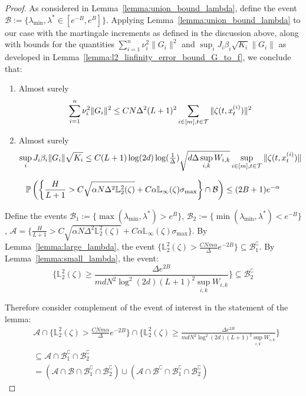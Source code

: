 \begin{proof}
    As considered in Lemma~\ref{lemma:union_bound_lambda}, define the event $\mathcal{B} := \{\lambda_{\min} , \lambda^* \in [e^{-B},e^B]\}$. Applying Lemma~\ref{lemma:union_bound_lambda} to our case with the martingale increments as defined in the discussion above, along with bounds for the quantities $\sum_{i=1}^{n}\nu_i^2\|G_i\|^2$ and $\sup_{i}J_i \beta_i \sqrt{K_i}\|G_i\|$ as developed in Lemma~\ref{lemma:l2_linfinity_error_bound_G_to_f}, we conclude that:
\begin{enumerate}
    \item Almost surely $$\sum_{i=1}^{n}\nu_i^2\|G_i\|^2 \leq C N \Delta^2(L+1)^2\sum_{i\in [m], t\in \mathcal{T}}\|\zeta(t,x^{(i)}_{t})\|^2$$ 
    \item Almost surely
    $$\sup_i J_i \beta_i \|G_i\|\sqrt{K_i} \leq C(L+1)\log(2d)\log(\tfrac{1}{\Delta})\sqrt{d\Delta\sup_{i,k}W_{i,k}}\sup_{i\in[m],t\in\mathcal{T}}\|\zeta(t,x_{t}^{(i)})\|$$ 
\end{enumerate}


    
    \begin{equation}\label{eq:conc_mart}
    \mathbb{P}\left(\biggr\{\frac{H}{L+1} > C\sqrt{\alpha N\Delta^2 \mathbb{L}_2^2(\zeta)}+C\alpha\mathbb{L}_{\infty}(\zeta)\sigma_{\max}\biggr\} \cap \mathcal{B}\right) \leq (2B+1)e^{-\alpha}
    \end{equation}

Define the events $\mathcal{B}_1 := \{\max(\lambda_{\min},\lambda^{*}) > e^B\}$, $\mathcal{B}_2 := \{\min(\lambda_{\min},\lambda^{*}) < e^{-B}\}$, $\mathcal{A} = \biggr\{\frac{H}{L+1} > C\sqrt{\alpha N\Delta^2 \mathbb{L}_2^2(\zeta)}+C\alpha\mathbb{L}_{\infty}(\zeta)\sigma_{\max}\biggr\}$. By Lemma~\ref{lemma:large_lambda}, the event  $\{\mathbb{L}_2^2(\zeta) > \frac{CNm\alpha}{\Delta}e^{-2B}\} \subseteq \mathcal{B}_1^{\complement}$. By Lemma~\ref{lemma:small_lambda}, the event: $$\biggr\{\mathbb{L}_2^2(\zeta)\geq \frac{\Delta e^{2B}}{md N^2 \log^2(2d)(L+1)^2\sup_{i,k}W_{i,k}}\biggr\} \subseteq \mathcal{B}_2^{\complement}$$

Therefore consider complement of the event of interest in the statement of the lemma: 
\begin{align*}
&\mathcal{A}\cap\biggr\{\mathbb{L}_2^2(\zeta) > \frac{CNm\alpha}{\Delta}e^{-2B}\biggr\} \cap \biggr\{\mathbb{L}_2^2(\zeta)\geq \frac{\Delta e^{2B}}{md N^2 \log^2(2d)(L+1)^2\sup_{i,k}W_{i,k}}\biggr\} \\
&\subseteq \mathcal{A}\cap \mathcal{B}_1^{\complement} \cap \mathcal{B}^{\complement}_2 \\
&= \left(\mathcal{A}\cap\mathcal{B}\cap\mathcal{B}_1^{\complement} \cap \mathcal{B}^{\complement}_2\right)\cup\left(\mathcal{A}\cap\mathcal{B}^{\complement}\cap\mathcal{B}_1^{\complement} \cap \mathcal{B}^{\complement}_2\right)
\end{align*}


\end{proof}
